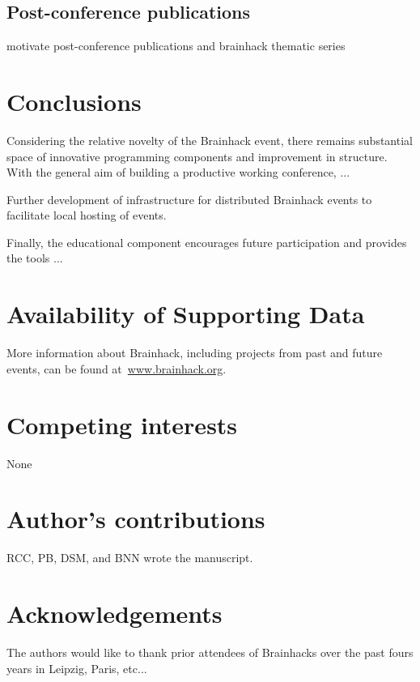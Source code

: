 \documentclass[11pt]{bmc_article_s50}
\begin{document}
\subsection{Post-conference publications}

motivate post-conference publications and brainhack thematic series

\section{Conclusions}

Considering the relative novelty of the Brainhack event, there remains substantial space of innovative programming components and improvement in structure. With the general aim of building a productive working conference, ...

Further development of infrastructure for distributed Brainhack events to facilitate local hosting of events. 

Finally, the educational component encourages future participation and provides the tools ...


\newpage
\section*{Availability of Supporting Data}
More information about Brainhack, including projects from past and future events, can be found at~\href{http://www.brainhack.org}{www.brainhack.org}.

\section*{Competing interests}
None

\section*{Author's contributions}
RCC, PB, DSM, and BNN wrote the manuscript.

\section*{Acknowledgements}
The authors would like to thank prior attendees of Brainhacks over the past fours years in Leipzig, Paris, etc... 






 
 
\end{document}
